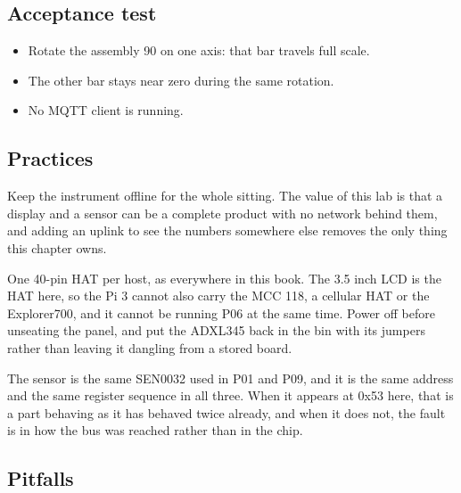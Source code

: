 \subsection*{Acceptance test}

\begin{itemize}
\item Rotate the assembly 90\textdegree{} on one axis: that bar travels full scale.
\item The other bar stays near zero during the same rotation.
\item No MQTT client is running.
\end{itemize}

\subsection*{Practices}

Keep the instrument offline for the whole sitting. The value of this lab is that a display and a sensor can be a complete product with no network behind them, and adding an uplink to see the numbers somewhere else removes the only thing this chapter owns.

One 40-pin HAT per host, as everywhere in this book. The 3.5 inch LCD is the HAT here, so the Pi 3 cannot also carry the MCC 118, a cellular HAT or the Explorer700, and it cannot be running P06 at the same time. Power off before unseating the panel, and put the ADXL345 back in the bin with its jumpers rather than leaving it dangling from a stored board.

The sensor is the same SEN0032 used in P01 and P09, and it is the same address and the same register sequence in all three. When it appears at 0x53 here, that is a part behaving as it has behaved twice already, and when it does not, the fault is in how the bus was reached rather than in the chip.

\subsection*{Pitfalls}


